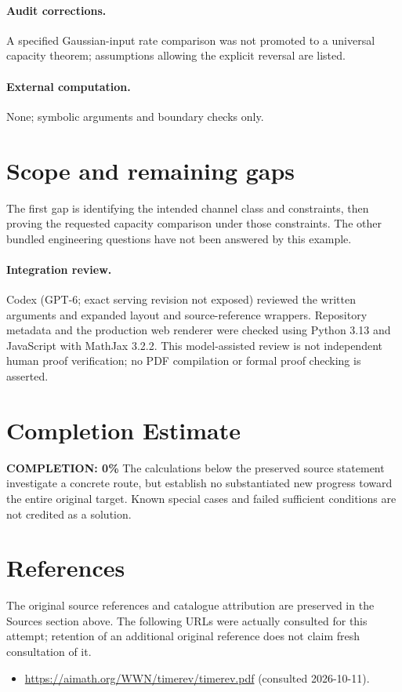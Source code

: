 \documentclass[11pt]{article}
\begin{document}
\paragraph{Audit corrections.} A specified Gaussian-input rate comparison was not promoted to a universal capacity theorem; assumptions allowing the explicit reversal are listed.
\paragraph{External computation.} None; symbolic arguments and boundary checks only.
\section{Scope and remaining gaps}
The first gap is identifying the intended channel class and constraints,
then proving the requested capacity comparison under those constraints. The
other bundled engineering questions have not been answered by this example.
\paragraph{Integration review.} Codex (GPT-6; exact serving revision not exposed) reviewed the written arguments and expanded layout and source-reference wrappers. Repository metadata and the production web renderer were checked using Python 3.13 and JavaScript with MathJax 3.2.2. This model-assisted review is not independent human proof verification; no PDF compilation or formal proof checking is asserted.

\section{Completion Estimate}
\noindent\textbf{COMPLETION: 0\%}
The calculations below the preserved source statement investigate a concrete route,
but establish no substantiated new progress toward the entire original target.
Known special cases and failed sufficient conditions are not credited as a solution.
\section{References}
The original source references and catalogue attribution are preserved in the
Sources section above. The following URLs were actually consulted for this attempt;
retention of an additional original reference does not claim fresh consultation of it.
\begin{itemize}
\item \url{https://aimath.org/WWN/timerev/timerev.pdf} (consulted 2026-10-11). 
\end{itemize}
\end{document}
